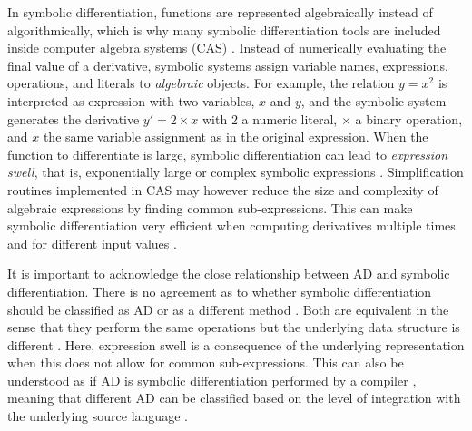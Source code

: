 In symbolic differentiation, functions are represented algebraically instead of algorithmically, which is why many symbolic differentiation tools are included inside computer algebra systems (CAS) \cite{Symbolics_jl_2022}. 
Instead of numerically evaluating the final value of a derivative, symbolic systems assign variable names, expressions, operations, and literals to \textit{algebraic} objects. 
For example, the relation $y = x^2$ is interpreted as expression with two variables, $x$ and $y$, and the symbolic system generates the derivative $y' = 2 \times x$ with $2$ a numeric literal, $\times$ a binary operation, and $x$ the same variable assignment as in the original expression.
When the function to differentiate is large, symbolic differentiation can lead to \textit{expression swell}, that is, exponentially large or complex symbolic expressions \cite{Baydin_Pearlmutter_Radul_Siskind_2015}.
Simplification routines implemented in CAS may however reduce the size and complexity of algebraic expressions by finding common sub-expressions.  
This can make symbolic differentiation very efficient when computing derivatives multiple times and for different input values \cite{Dürrbaum_Klier_Hahn_2002}. 

It is important to acknowledge the close relationship between AD and symbolic differentiation.
There is no agreement as to whether symbolic differentiation should be classified as AD \cite{juedes1991taxonomy, Elliott_2018, Laue2020} or as a different method \cite{Baydin_Pearlmutter_Radul_Siskind_2015}.  
Both are equivalent in the sense that they perform the same operations but the underlying data structure is different \cite{Laue2020}. 
Here, expression swell is a consequence of the underlying representation when this does not allow for common sub-expressions. 
This can also be understood as if AD is symbolic differentiation performed by a compiler \cite{Elliott_2018}, meaning that different AD can be classified based on the level of integration with the underlying source language \cite{juedes1991taxonomy}.
